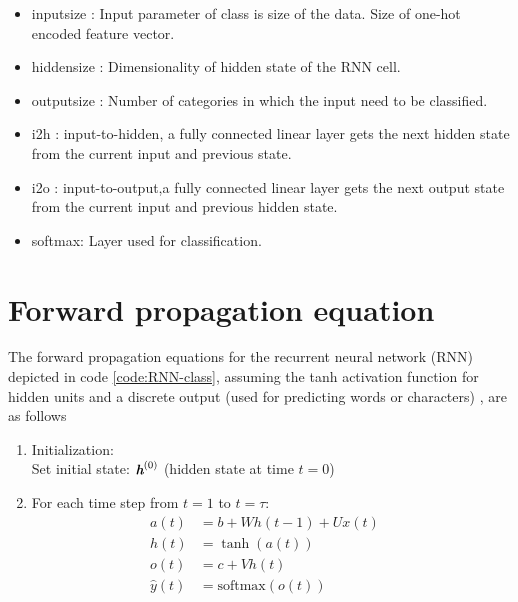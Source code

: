 \begin{itemize}
    \item input\textunderscore size : Input parameter of class is size of the data. Size of one-hot encoded feature vector. 
    \item  hidden\textunderscore size : Dimensionality of hidden state of the \acs{RNN} cell.
    \item  output\textunderscore size : Number of categories in which the input need to be classified.
    \item i2h : input-to-hidden, a fully connected linear layer gets the next hidden state from the current input and previous state.
    \item i2o : input-to-output,a fully connected linear layer gets the next output state from the current input and previous hidden state.
    \item softmax: Layer used for classification. 
\end{itemize}

\section{Forward propagation equation} \label{sec:forward-propagation}
The forward propagation equations for the recurrent neural network (RNN) depicted in code \ref{code:RNN-class}, assuming the tanh activation function for hidden units and a discrete output (used for predicting words or characters) \parencite{Goodfellow-et-al-2016}, are as follows
\begin{enumerate}
    \item Initialization: \\
    Set initial state: $\textit{\textbf{h}}^{(0)}$ (hidden state at time $t=0$)
    \item For each time step from $t=1$ to $t=\tau$: \\
    \begin{align}
        a(t) &= b + Wh(t-1) + Ux(t) \quad  \\
        h(t) &= \tanh(a(t)) \quad  \\
        o(t) &= c + Vh(t) \quad  \\
        \hat{y}(t) &= \text{softmax}(o(t)) \quad 
        \end{align}
\end{enumerate}

